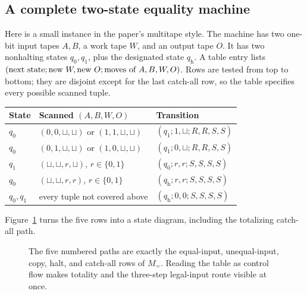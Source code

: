 \subsection{A complete two-state equality machine}

Here is a small instance in the paper's multitape style.  The machine has two
one-bit input tapes \(A,B\), a work tape \(W\), and an output tape \(O\).  It
has two nonhalting states \(q_0,q_1\), plus the designated state
\(q_{\mathrm h}\).  A table entry lists
\((\hbox{next state};\hbox{new }W,\hbox{new }O;
  \hbox{moves of }A,B,W,O)\).
Rows are tested from top to bottom; they are disjoint except for the last
catch-all row, so the table specifies every possible scanned tuple.

\begin{center}
\small
\begin{tabularx}{\textwidth}{P{0.09\textwidth}P{0.24\textwidth}X}
\toprule
State & Scanned \((A,B,W,O)\) & Transition \\
\midrule
\(q_0\) & \((0,0,\sqcup,\sqcup)\) or
          \((1,1,\sqcup,\sqcup)\)
 & \((q_1;1,\sqcup;R,R,S,S)\) \\
\(q_0\) & \((0,1,\sqcup,\sqcup)\) or
          \((1,0,\sqcup,\sqcup)\)
 & \((q_1;0,\sqcup;R,R,S,S)\) \\
\(q_1\) & \((\sqcup,\sqcup,r,\sqcup)\), \(r\in\{0,1\}\)
 & \((q_0;r,r;S,S,S,S)\) \\
\(q_0\) & \((\sqcup,\sqcup,r,r)\), \(r\in\{0,1\}\)
 & \((q_{\mathrm h};r,r;S,S,S,S)\) \\
\(q_0,q_1\) & every tuple not covered above
 & \((q_{\mathrm h};0,0;S,S,S,S)\) \\
\bottomrule
\end{tabularx}
\end{center}

Figure~\ref{fig:eq-machine-states} turns the five rows into a state diagram,
including the totalizing catch-all path.

\begin{figure}[t]
\centering

\caption{The five numbered paths are exactly the equal-input, unequal-input, copy, halt, and catch-all rows of \(M_=\).  Reading the table as control flow makes totality and the three-step legal-input route visible at once.}
\label{fig:eq-machine-states}
\end{figure}

